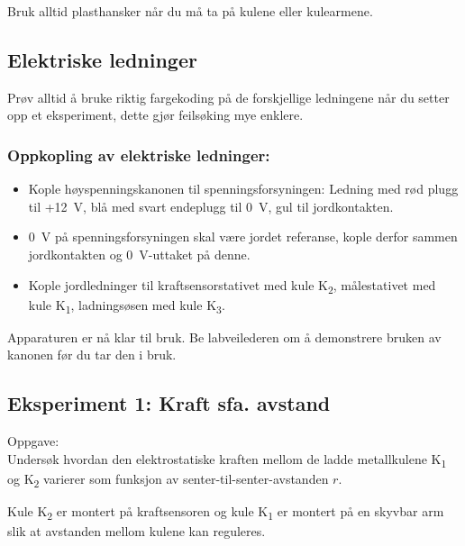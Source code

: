 \documentclass[../Elmag-labhefte-2020.tex]{subfiles}
\begin{document}
\begin{itemize}
Bruk alltid plasthansker når du må ta på kulene eller kulearmene.


\subsection{Elektriske ledninger}
Prøv alltid å bruke riktig fargekoding på de forskjellige ledningene når du setter opp et eksperiment, dette gjør feilsøking mye enklere. 

\subsubsection{Oppkopling av elektriske ledninger:}

\vspace{-4mm}
\begin{itemize}
    \item Kople høyspenningskanonen til spenningsforsyningen: Ledning med rød plugg til +\SI{12}{\volt}, blå med svart endeplugg til \SI{0}{\volt}, gul til jordkontakten.
    \item \SI{0}{\volt} på spenningsforsyningen skal være jordet referanse, kople derfor sammen jordkontakten og \SI{0}{\volt}-uttaket på denne. 
    \item Kople jordledninger til kraftsensorstativet med kule K\textsubscript{2}, målestativet med kule K\textsubscript{1}, ladningsøsen med kule K\textsubscript{3}. 
\end{itemize}

Apparaturen er nå klar til bruk.  Be labveilederen om å demonstrere bruken av kanonen før du tar den i bruk.



\subsection{Eksperiment 1: Kraft sfa. avstand}
 
Oppgave:\\
{\itsf Undersøk hvordan den elektrostatiske kraften mellom de ladde metallkulene K\textsubscript{1} og K\textsubscript{2} varierer som funksjon av senter-til-senter-avstanden $r$. 
}

Kule K\textsubscript{2} er montert på kraftsensoren og kule K\textsubscript{1} er montert på en skyvbar arm slik at avstanden mellom kulene kan reguleres. 



\end{itemize}
\end{document}
